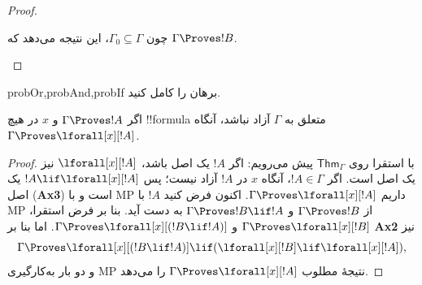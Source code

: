 \documentclass[../../../include/open-logic-section]{subfiles}
\begin{document}
\begin{proof}
\begin{enumerate}
{{چون $\Gamma_0\subseteq\Gamma$، این نتیجه می‌دهد که
$\Gamma\Proves !B$.}}


\end{enumerate}
\end{proof}

\begin{probtag}{probOr,probAnd,probIf}
برهان  را کامل کنید.
\end{probtag}

\begin{thm}[تعمیم]
اگر $\Gamma \Proves !A$ و $x$ در هیچ !!{formula} متعلق به $\Gamma$
آزاد نباشد، آنگاه $\Gamma \Proves \lforall[x][!A]$.
\end{thm}

\begin{proof}
با استقرا روی $\mathsf{Thm}_\Gamma$ پیش می‌رویم: اگر $!A$ یک اصل باشد،
$\lforall[x][!A]$ نیز یک اصل است. اگر $!A\in\Gamma$، آنگاه $x$ در
$!A$ آزاد نیست؛ پس $!A\lif\lforall[x][!A]$ یک اصل
(\textbf{Ax3}) است و با MP داریم
$\Gamma\Proves\lforall[x][!A]$. اکنون فرض کنید $!A$ با MP از
$\Gamma\Proves !B$ و $\Gamma\Proves !B\lif !A$ به دست آید. بنا بر فرض
استقرا،
$\Gamma\Proves\lforall[x][!B]$ و
$\Gamma\Proves\lforall[x][(!B\lif !A)]$. اما بنا بر \textbf{Ax2} نیز
\[
\Gamma \Proves
\lforall[x][(!B \lif !A)] \lif
(\lforall[x][!B] \lif \lforall[x][!A]),
\]
و دو بار به‌کارگیری MP نتیجهٔ مطلوب
$\Gamma\Proves\lforall[x][!A]$ را می‌دهد.
\end{proof}
\end{document}
